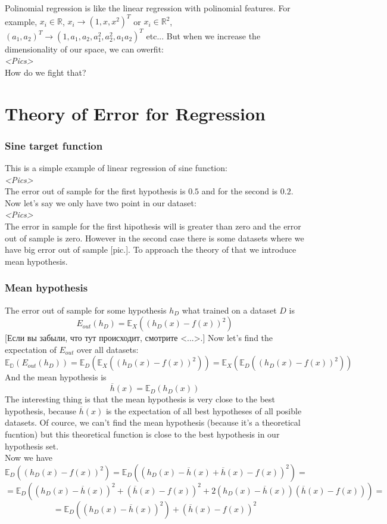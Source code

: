 Polinomial regression is like the linear regression with polinomial features. For example, $x_i\in\mathbb{R}$, $x_i\to(1,x,x^2)^T$ or $x_i\in\mathbb{R}^2$, $(a_1, a_2)^T\to(1,a_1,a_2,a_1^2,a_2^2,a_1a_2)^T$ etc... But when we increase the dimensionality of our space, we can owerfit:\\
{\it <Pics>}\\
How do we fight that?

\section{Theory of Error for Regression}
\vspace{-0.6cm}
\subsubsection*{Sine target function}

This is a simple example of linear regression of sine function:\\
{\it <Pics>}\\
The error out of sample for the first hypothesis is $0.5$ and for the second is $0.2$. Now let's say we only have two point in our dataset:\\
{\it <Pics>}\\
The error in sample for the first hipothesis will is greater than zero and the error out of sample is zero. However in the second case there is some datasets where we have big error out of sample [pic.]. To approach the theory of that we introduce mean hypothesis.

\subsubsection*{Mean hypothesis}

The error out of sample for some hypothesis $h_D$ what trained on a dataset $D$ is
$$E_{out}(h_D)=\mathbb{E}_X\left(\left(h_D(x)-f(x)\right)^2\right)$$
[Если вы забыли, что тут происходит, смотрите <...>.] Now let's find the expectation of $E_{out}$ over all datasets:
$$\mathbb{E_D}\left(E_{out}(h_D)\right)=\mathbb{E}_D\left(\mathbb{E}_X\left(\left(h_D(x)-f(x)\right)^2\right)\right)=\mathbb{E}_X\left(\mathbb{E}_D\left(\left(h_D(x)-f(x)\right)^2\right)\right)$$
And the mean hypothesis is
$$\overline{h}(x)=\mathbb{E}_D\left(h_D(x)\right)$$
The interesting thing is that the mean hypothesis is very close to the best hypothesis, because $\overline{h}(x)$ is the expectation of all best hypotheses of all posible datasets. Of cource, we can't find the mean hypothesis (because it's a theoretical fucntion) but this theoretical function is close to the best hypothesis in our hypothesis set.\\
Now we have
$$\mathbb{E}_D\left(\left(h_D(x)-f(x)\right)^2\right)=\mathbb{E}_D\left(\left(h_D(x)-\overline{h}(x)+\overline{h}(x)-f(x)\right)^2\right)=$$
$$=\mathbb{E}_D\left(\left(h_D(x)-\overline{h}(x)\right)^2+\left(\overline{h}(x)-f(x)\right)^2+2\left(h_D(x)-\overline{h}(x)\right)\left(\overline{h}(x)-f(x)\right)\right)=$$
$$=\mathbb{E}_D\left(\left(h_D(x)-\overline{h}(x)\right)^2\right)+\left(\overline{h}(x)-f(x)\right)^2$$

